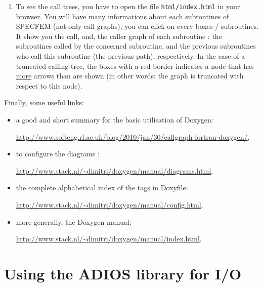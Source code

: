\begin{enumerate}
\item To see the call trees, you have to open the file \texttt{html/index.html} in your \underline{browser}. You will have many informations about each subroutines of SPECFEM (not only call graphs), you can click on every boxes / subroutines. It show you the call, and, the caller graph of each subroutine : the subroutines called by the concerned subroutine, and the previous subroutines who call this subroutine (the previous path), respectively. In the case of a truncated calling tree, the boxes with a red border indicates a node that has \underline{more} arrows than are shown (in other words: the graph is truncated with respect to this node).

\end{enumerate}

\medskip

\noindent Finally, some useful links:

\begin{itemize}
\item[\textbullet] a good and short summary for the basic utilisation of Doxygen:

\url{http://www.softeng.rl.ac.uk/blog/2010/jan/30/callgraph-fortran-doxygen/},

\item[\textbullet] to configure the diagrams :

\url{http://www.stack.nl/~dimitri/doxygen/manual/diagrams.html},

\item[\textbullet] the complete alphabetical index of the tags in Doxyfile:

\url{http://www.stack.nl/~dimitri/doxygen/manual/config.html},

\item[\textbullet] more generally, the Doxygen manual:

\url{http://www.stack.nl/~dimitri/doxygen/manual/index.html}.

\end{itemize}

\medskip

\section{Using the ADIOS library for I/O}

